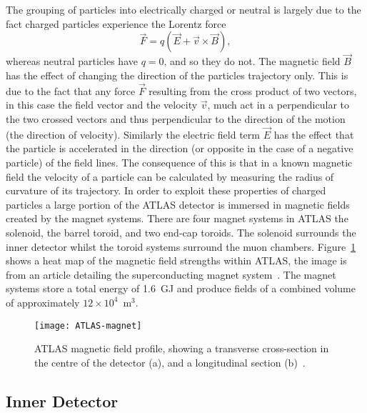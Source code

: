 The grouping of particles into electrically charged or neutral is largely due to
the fact charged particles experience the Lorentz force
\begin{equation}
  \label{eq:lorentz}
  \vec{F} = q(\vec{E} + \vec{v} \times \vec{B}),
\end{equation}
whereas neutral particles have $q=0$, and so they do not. The magnetic field
$\vec{B}$ has the effect of changing the direction of the particles trajectory
only. This is due to the fact that any force $\vec{F}$ resulting from the cross
product of two vectors, in this case the field vector and the velocity $\vec{v}$,
much act in a perpendicular to the two crossed vectors and thus perpendicular to
the direction of the motion (the direction of velocity). Similarly the electric
field term $\vec{E}$ has the effect that the particle is accelerated in the
direction (or opposite in the case of a negative particle) of the field lines.
The consequence of this is that in a known magnetic field the velocity of a
particle can be calculated by measuring the radius of curvature of its
trajectory. In order to exploit these properties of charged particles a large
portion of the ATLAS detector is immersed in magnetic fields created by the
magnet systems. There are four magnet systems in ATLAS the solenoid, the barrel
toroid, and two end-cap toroids. The solenoid surrounds the inner detector
whilst the toroid systems surround the muon chambers.
Figure~\ref{fig:ATLAS-magnets} shows a heat map of the magnetic field strengths
within ATLAS, the image is from an article detailing the superconducting magnet
system~\cite{ATLAS-magnets}. The magnet systems store a total energy of 1.6~GJ
and produce fields of a combined volume of approximately
$12\times 10^4$~m$^3$.
\begin{figure}[h]
  \centering
  \texttt{[image: ATLAS-magnet]}
  \caption[ATLAS magnetic field]{ATLAS magnetic field profile, showing a
    transverse cross-section in the centre of the detector (a), and a
    longitudinal section (b)~\cite{ATLAS-magnets}.}%
  \label{fig:ATLAS-magnets}
\end{figure}

\subsection{Inner Detector}%
\label{sec:id}

